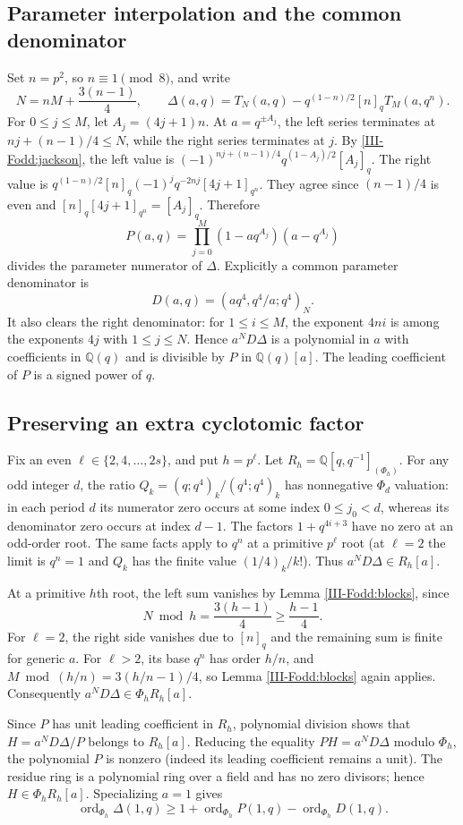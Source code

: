 \documentclass[11pt,letterpaper]{article}
\numberwithin{equation}{section}
\newcommand{\vp}{\operatorname{ord}}
\begin{document}
\subsection{Parameter interpolation and the common denominator}
Set $n=p^2$, so $n\equiv1\pmod8$, and write
\[
 N=nM+\frac{3(n-1)}4,\qquad
 \Delta(a,q)=T_N(a,q)-q^{(1-n)/2}[n]_qT_M(a,q^n).
\]
For $0\le j\le M$, let $A_j=(4j+1)n$.
At $a=q^{\pm A_j}$, the left series terminates at
$nj+(n-1)/4\le N$, while the right series terminates at $j$.
By \eqref{III-Fodd:jackson}, the left value is
$(-1)^{nj+(n-1)/4}q^{(1-A_j)/2}[A_j]_q$.
The right value is
$q^{(1-n)/2}[n]_q(-1)^j q^{-2nj}[4j+1]_{q^n}$.
They agree since $(n-1)/4$ is even and
$[n]_q[4j+1]_{q^n}=[A_j]_q$. Therefore
\[
 P(a,q)=\prod_{j=0}^{M}(1-aq^{A_j})(a-q^{A_j})
\]
divides the parameter numerator of $\Delta$.
Explicitly a common parameter denominator is
\[
 D(a,q)=(aq^4,q^4/a;q^4)_N.
\]
It also clears the right denominator: for $1\le i\le M$, the
exponent $4ni$ is among the exponents $4j$ with $1\le j\le N$.
Hence $a^ND\Delta$ is a polynomial in $a$ with coefficients in
$\mathbb Q(q)$ and is divisible by $P$ in $\mathbb Q(q)[a]$.
The leading coefficient of $P$ is a signed power of $q$.

\subsection{Preserving an extra cyclotomic factor}
Fix an even $\ell\in\{2,4,\ldots,2s\}$, and put $h=p^\ell$.
Let $R_h=\mathbb Q[q,q^{-1}]_{(\Phi_h)}$.
For any odd integer $d$, the ratio $Q_k=(q;q^4)_k/(q^4;q^4)_k$
has nonnegative $\Phi_d$ valuation: in each period $d$ its numerator
zero occurs at some index $0\le j_0<d$, whereas its denominator zero
occurs at index $d-1$. The factors $1+q^{4i+3}$ have no zero at an
odd-order root. The same facts apply to $q^n$ at a primitive
$p^\ell$ root (at $\ell=2$ the limit is $q^n=1$ and $Q_k$ has the
finite value $(1/4)_k/k!$). Thus
$a^ND\Delta\in R_h[a]$.

At a primitive $h$th root, the left sum vanishes by Lemma
\ref{III-Fodd:blocks}, since
\[
 N\bmod h=\frac{3(h-1)}4\ge\frac{h-1}4.
\]
For $\ell=2$, the right side vanishes due to $[n]_q$ and the remaining
sum is finite for generic $a$. For $\ell>2$, its base $q^n$ has order
$h/n$, and
$M\bmod(h/n)=3(h/n-1)/4$, so Lemma \ref{III-Fodd:blocks} again applies.
Consequently $a^ND\Delta\in\Phi_hR_h[a]$.

Since $P$ has unit leading coefficient in $R_h$, polynomial division
shows that $H=a^ND\Delta/P$ belongs to $R_h[a]$. Reducing the equality
$PH=a^ND\Delta$ modulo $\Phi_h$, the polynomial $P$ is nonzero
(indeed its leading coefficient remains a unit). The residue ring
is a polynomial ring over a field and has no zero divisors; hence
$H\in\Phi_hR_h[a]$. Specializing $a=1$ gives
\begin{equation}\label{III-Fodd:multiplicity}
 \vp_{\Phi_h}\Delta(1,q)\ge1+
 \vp_{\Phi_h}P(1,q)-\vp_{\Phi_h}D(1,q).
\end{equation}
\end{document}
